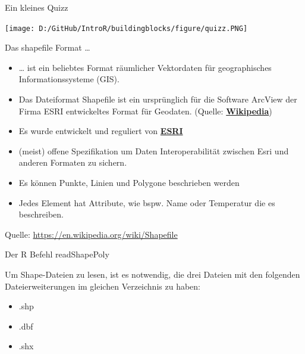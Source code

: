 \documentclass[ignorenonframetext,]{beamer}
\providecommand{\tightlist}{%
  \setlength{\itemsep}{0pt}\setlength{\parskip}{0pt}}
\begin{document}
\begin{frame}{Ein kleines Quizz}
\protect\hypertarget{ein-kleines-quizz}{}

\texttt{[image: D:/GitHub/IntroR/buildingblocks/figure/quizz.PNG]}

\end{frame}

\begin{frame}{Das shapefile Format \ldots{}}
\protect\hypertarget{das-shapefile-format}{}

\begin{itemize}
\item
  \ldots{} ist ein beliebtes Format räumlicher Vektordaten für
  geographisches Informationssysteme (GIS).
\item
  Das Dateiformat Shapefile ist ein ursprünglich für die Software
  ArcView der Firma ESRI entwickeltes Format für Geodaten. (Quelle:
  \href{https://de.wikipedia.org/wiki/Shapefile}{\textbf{Wikipedia}})
\item
  Es wurde entwickelt und reguliert von
  \href{http://www.esri.com/}{\textbf{ESRI}}
\item
  (meist) offene Spezifikation um Daten Interoperabilität zwischen Esri
  und anderen Formaten zu sichern.
\item
  Es können Punkte, Linien und Polygone beschrieben werden
\item
  Jedes Element hat Attribute, wie bspw. Name oder Temperatur die es
  beschreiben.
\end{itemize}

Quelle: \url{https://en.wikipedia.org/wiki/Shapefile}

\end{frame}

\begin{frame}{Der R Befehl readShapePoly}
\protect\hypertarget{der-r-befehl-readshapepoly}{}

Um Shape-Dateien zu lesen, ist es notwendig, die drei Dateien mit den
folgenden Dateierweiterungen im gleichen Verzeichnis zu haben:

\begin{itemize}
\tightlist
\item
  .shp
\item
  .dbf
\item
  .shx
\end{itemize}

\end{frame}
\end{document}
